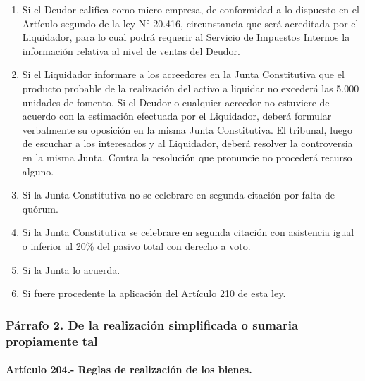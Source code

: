 \documentclass[
]{book}
\begin{document}
\begin{enumerate}
\def\labelenumi{\alph{enumi})}
\item
  Si el Deudor califica como micro empresa, de conformidad a lo dispuesto en el Artículo segundo de la ley N° 20.416, circunstancia que será acreditada por el Liquidador, para lo cual podrá requerir al Servicio de Impuestos Internos la información relativa al nivel de ventas del Deudor.
\item
  Si el Liquidador informare a los acreedores en la Junta Constitutiva que el producto probable de la realización del activo a liquidar no excederá las 5.000 unidades de fomento. Si el Deudor o cualquier acreedor no estuviere de acuerdo con la estimación efectuada por el Liquidador, deberá formular verbalmente su oposición en la misma Junta Constitutiva. El tribunal, luego de escuchar a los interesados y al Liquidador, deberá resolver la controversia en la misma Junta. Contra la resolución que pronuncie no procederá recurso alguno.
\item
  Si la Junta Constitutiva no se celebrare en segunda citación por falta de quórum.
\item
  Si la Junta Constitutiva se celebrare en segunda citación con asistencia igual o inferior al 20\% del pasivo total con derecho a voto.
\item
  Si la Junta lo acuerda.
\item
  Si fuere procedente la aplicación del Artículo 210 de esta ley.
\end{enumerate}

\hypertarget{puxe1rrafo-2.-de-la-realizaciuxf3n-simplificada-o-sumaria-propiamente-tal}{%
\subsubsection*{Párrafo 2. De la realización simplificada o sumaria propiamente tal}\label{puxe1rrafo-2.-de-la-realizaciuxf3n-simplificada-o-sumaria-propiamente-tal}}

\hypertarget{artuxedculo-204.--reglas-de-realizaciuxf3n-de-los-bienes.}{%
\paragraph*{Artículo 204.- Reglas de realización de los bienes.}\label{artuxedculo-204.--reglas-de-realizaciuxf3n-de-los-bienes.}}
\end{document}
